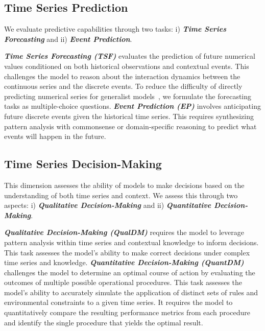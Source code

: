\documentclass{article}
\theoremstyle{plain}
\theoremstyle{definition}
\theoremstyle{remark}
\theoremstyle{plain}
\begin{document}
\subsection{Time Series Prediction}
We evaluate predictive capabilities through two tasks: i) \textbf{\textit{Time Series Forecasting}} and ii) \textbf{\textit{Event Prediction}}.

\textbf{\textit{Time Series Forecasting (TSF)}} evaluates the prediction of future numerical values conditioned on both historical observations and contextual events. This challenges the model to reason about the interaction dynamics between the continuous series and the discrete events. To reduce the difficulty of directly predicting numerical series for generalist models~\citep{tan2024language}, we formulate the forecasting tasks as multiple-choice questions.
\textbf{\textit{Event Prediction (EP)}} involves anticipating future discrete events given the historical time series. This requires synthesizing pattern analysis with commonsense or domain-specific reasoning to predict what events will happen in the future.

\subsection{Time Series Decision-Making}  
This dimension assesses the ability of models to make decisions based on the understanding of both time series and context. We assess this through two aspects: i) \textbf{\textit{Qualitative Decision-Making}} and ii) \textbf{\textit{Quantitative Decision-Making}}.

\textbf{\textit{Qualitative Decision-Making (QualDM)}} requires the model to leverage pattern analysis within time series and contextual knowledge to inform decisions. This task assesses the model's ability to make correct decisions under complex time series and knowledge.
\textbf{\textit{Quantitative Decision-Making (QuantDM)}} challenges the model to determine an optimal course of action by evaluating the outcomes of multiple possible operational procedures. This task assesses the model's ability to accurately simulate the application of distinct sets of rules and environmental constraints to a given time series. It requires the model to quantitatively compare the resulting performance metrics from each procedure and identify the single procedure that yields the optimal result.
\end{document}
